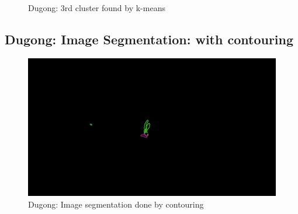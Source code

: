 \documentclass[conference]{IEEEtran}
\begin{document}
\begin{figure}[!htb]
\begin{minipage}[b]{0.2\textwidth}
    \caption{Dugong: 3rd cluster found by k-means}
    \label{Dugong: 3rd cluster found by k-means}
  \end{minipage}
\end{figure}

\subsection{Dugong: Image Segmentation: with contouring}

\begin{figure}[htp]
\includegraphics[width=0.5\linewidth]{../programme/results/Task_4/dugong/contours/image_0.jpg}
\centering
\caption{Dugong: Image segmentation done by contouring}
\label{Dugong Image segmentation done by contouring}
\end{figure}
\end{document}
